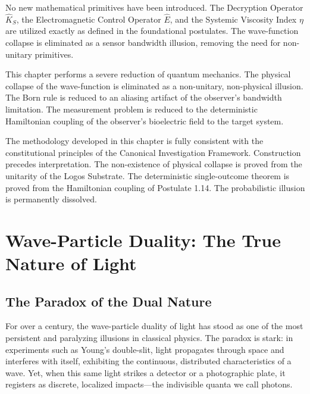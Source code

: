 \documentclass[12pt,twoside]{extbook}
\theoremstyle{definition}
\theoremstyle{remark}
\newenvironment{primitiveaudit}{%
    \begin{tcolorbox}[enhanced,colback=gray!5,colframe=brandPrimary!70,boxrule=0pt,leftrule=2pt,arc=0mm,detach title,before upper={\tcbtitle\par\vspace{3pt}},title=\textsc{Primitive Audit},fonttitle=\bfseries\color{brandPrimary}]%
}{\end{tcolorbox}}
\newenvironment{reductionaudit}{%
    \begin{tcolorbox}[enhanced,colback=gray!5,colframe=brandPrimary!70,boxrule=0pt,leftrule=2pt,arc=0mm,detach title,before upper={\tcbtitle\par\vspace{3pt}},title=\textsc{Reduction Audit},fonttitle=\bfseries\color{brandPrimary}]%
}{\end{tcolorbox}}
\newenvironment{consistencyaudit}{%
    \begin{tcolorbox}[enhanced,colback=gray!5,colframe=brandPrimary!70,boxrule=0pt,leftrule=2pt,arc=0mm,detach title,before upper={\tcbtitle\par\vspace{3pt}},title=\textsc{Consistency Audit},fonttitle=\bfseries\color{brandPrimary}]%
}{\end{tcolorbox}}
\begin{document}
\begin{primitiveaudit}
No new mathematical primitives have been introduced. The Decryption Operator $\hat{K}_S$, the Electromagnetic Control Operator $\hat{E}$, and the Systemic Viscosity Index $\eta$ are utilized exactly as defined in the foundational postulates. The wave-function collapse is eliminated as a sensor bandwidth illusion, removing the need for non-unitary primitives.
\end{primitiveaudit}

\begin{reductionaudit}
This chapter performs a severe reduction of quantum mechanics. The physical collapse of the wave-function is eliminated as a non-unitary, non-physical illusion. The Born rule is reduced to an aliasing artifact of the observer's bandwidth limitation. The measurement problem is reduced to the deterministic Hamiltonian coupling of the observer's bioelectric field to the target system.
\end{reductionaudit}

\begin{consistencyaudit}
The methodology developed in this chapter is fully consistent with the constitutional principles of the Canonical Investigation Framework. Construction precedes interpretation. The non-existence of physical collapse is proved from the unitarity of the Logos Substrate. The deterministic single-outcome theorem is proved from the Hamiltonian coupling of Postulate 1.14. The probabilistic illusion is permanently dissolved.
\end{consistencyaudit}

\chapter{Wave-Particle Duality: The True Nature of Light}

\section{The Paradox of the Dual Nature}
For over a century, the wave-particle duality of light has stood as one of the most persistent and paralyzing illusions in classical physics. The paradox is stark: in experiments such as Young's double-slit, light propagates through space and interferes with itself, exhibiting the continuous, distributed characteristics of a wave. Yet, when this same light strikes a detector or a photographic plate, it registers as discrete, localized impacts---the indivisible quanta we call photons. 
\end{document}

